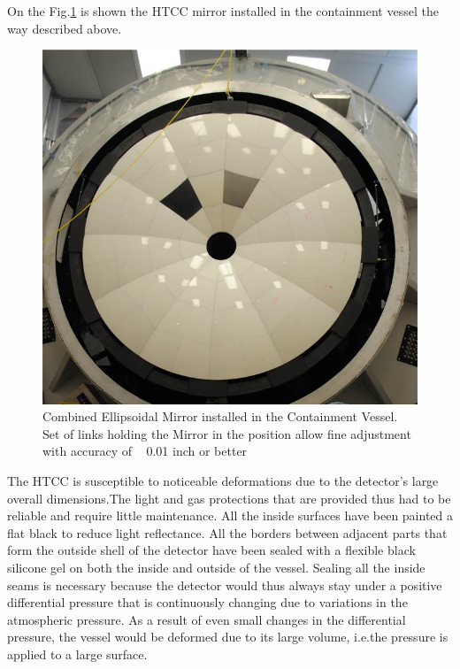 On the Fig.\ref{fig:HTCC_MIRR_INST} is shown the HTCC mirror installed in the containment vessel the way described above.

\begin{figure}[ht]
    \centering
    \includegraphics[width=1.0\linewidth,trim={0 0cm 0 0},clip]{images/HTCC_MIRR_INST.jpg}
    \caption{Combined Ellipsoidal Mirror installed in the Containment Vessel. Set of links holding the Mirror in the position allow fine adjustment with accuracy of ~ 0.01 inch or better}
    \label{fig:HTCC_MIRR_INST}
\end{figure}

\indent The HTCC is susceptible to noticeable deformations due to the detector's large overall dimensions.The light and gas protections that are provided thus had to be reliable and require little maintenance. All the inside surfaces have been painted a flat black to reduce light reflectance. All the borders between adjacent parts that form the outside shell of the detector have been sealed with a flexible black silicone gel on both the inside and outside of the vessel. Sealing all the inside seams is necessary because the detector would thus always stay under a positive differential pressure that is continuously changing due to variations in the atmospheric pressure. As a result of even small changes in the differential pressure, the vessel would be deformed due to its large volume, i.e.the pressure is applied to a large surface. 

